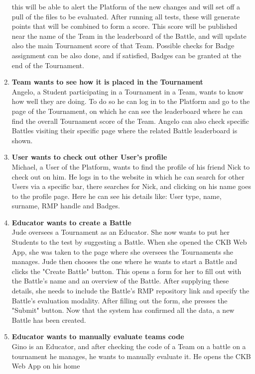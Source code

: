\begin{enumerate}[label= \textbf{SC\arabic*}]
    this will be able to alert the Platform of the new changes and will set off a pull of the files to be evaluated. After running all tests, these will generate points that will be combined to form a score. This score will be 
    published near the name of the Team in the leaderboard of the Battle, and will update also the main Tournament score of that Team. Possible checks for Badge assignment can be also done, and if satisfied, Badges can be granted at 
    the end of the Tournament.
    \item \textbf{Team wants to see how it is placed in the Tournament} \label{sc:sc9} \\ Angelo, a Student participating in a Tournament in a Team, wants to know how well they are doing. To do so he can log in to the Platform and go to the page 
    of the Tournament, on which he can see the leaderboard where he can find the overall Tournament score of the Team. Angelo can also check specific Battles visiting their specific page where the related Battle leaderboard is shown.
    \item \textbf{User wants to check out other User's profile} \label{sc:sc10} \\ Michael, a User of the Platform, wants to find the profile of his friend Nick to check out on him. He logs in to the website in which he can search for other Users 
    via a specific bar, there searches for Nick, and clicking on his name goes to the profile page. Here he can see his details like: User type, name, surname, RMP handle and Badges.
    \item \textbf{Educator wants to create a Battle} \label{sc:sc11} \\Jude oversees a Tournament as an Educator. She now wants to put her Students to the test by suggesting a Battle. When she opened the CKB Web App, she was taken to the page where she 
    oversees the Tournaments she manages. Jude then chooses the one where he wants to start a Battle and clicks the "Create Battle" button. This opens a form for her to fill out with the Battle's name and an overview of the Battle. 
    After supplying these details, she needs to include the Battle's RMP repository link and specify the Battle's evaluation modality. After filling out the form, she presses the "Submit" button. Now that the system has confirmed all 
    the data, a new Battle has been created.\\
    \item \textbf{Educator wants to manually evaluate teams code} \label{sc:sc12} \\ Gino is an Educator, and after checking the code of a Team on a battle on a tournament he manages, he wants to manually evaluate it. He opens the CKB Web App on his home 

\end{enumerate}

